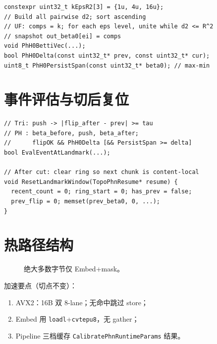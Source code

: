 \begin{lstlisting}[caption={嵌套 eps 一次扫边},label={lst:phn-h0}]
constexpr uint32_t kEpsR2[3] = {1u, 4u, 16u};
// Build all pairwise d2; sort ascending
// UF: comps = k; for each eps level, unite while d2 <= R^2
// snapshot out_beta0[ei] = comps
void PhH0BettiVec(...);
bool PhH0Delta(const uint32_t* prev, const uint32_t* cur);
uint8_t PhH0PersistSpan(const uint32_t* beta0); // max-min
\end{lstlisting}

\section{事件评估与切后复位}

\begin{lstlisting}[caption={EvalEvent + ResetLandmarkWindow},label={lst:eval-reset}]
// Tri: push -> |flip_after - prev| >= tau
// PH : beta_before, push, beta_after;
//      flipOK && PhH0Delta [&& PersistSpan >= delta]
bool EvalEventAtLandmark(...);

// After cut: clear ring so next chunk is content-local
void ResetLandmarkWindow(TopoPhnResume* resume) {
  recent_count = 0; ring_start = 0; has_prev = false;
  prev_flip = 0; memset(prev_beta0, 0, ...);
}
\end{lstlisting}

\section{热路径结构}

\begin{figure}[htbp]
\centering
{}
\caption{绝大多数字节仅 Embed+mask。}
\label{fig:phn-hotpath}
\end{figure}

加速要点（切点不变）：
\begin{enumerate}[nosep]
  \item AVX2：16B 双 8-lane；无命中跳过 store；
  \item Embed 用 \texttt{loadl}+\texttt{cvtepu8}，无 gather；
  \item Pipeline 三档缓存 \texttt{CalibratePhnRuntimeParams} 结果。
\end{enumerate}

